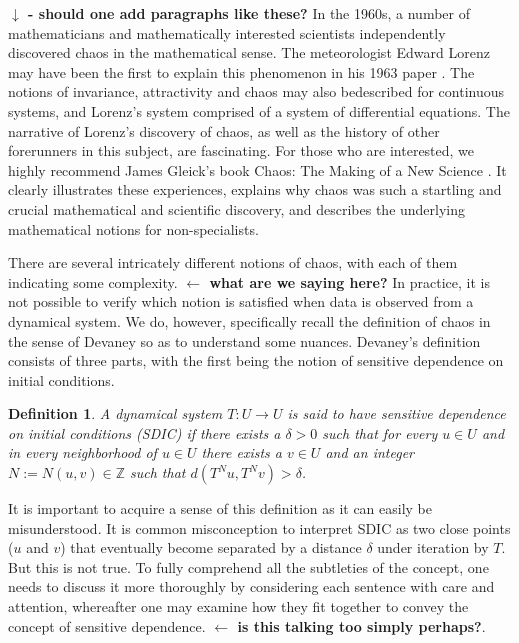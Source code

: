 \documentclass[12 pt]{article}
\newtheorem{Definition}{Definition}[]
\begin{document}
\textbf{$\downarrow$ - should one add paragraphs like these?}
\newline In the 1960s, a number of mathematicians and mathematically interested scientists independently discovered chaos in the mathematical sense. The meteorologist Edward Lorenz may have been the first to explain this phenomenon in his 1963 paper \cite{lorenz1963deterministic}. The notions of invariance, attractivity and chaos may also bedescribed for continuous systems, and Lorenz's system comprised of a system of differential equations. The narrative of Lorenz's discovery of chaos, as well as the history of other forerunners in this subject, are fascinating. For those who are interested, we highly recommend James Gleick's book Chaos: The Making of a New Science \cite{gleick2008chaos}. It clearly illustrates these experiences, explains why chaos was such a startling and crucial mathematical and scientific discovery, and describes the underlying mathematical notions for non-specialists.

There are several intricately different notions of chaos, with each of them indicating some complexity. \textbf{ $\leftarrow  $ what are we saying here?} In practice, it is not possible to verify which notion is satisfied when data is observed from a dynamical system. We do, however, specifically recall the definition of chaos in the sense of Devaney \cite{devaney2018introduction,de2013elements} so as to understand some nuances. Devaney's definition consists of three parts, with the first being the notion  of sensitive dependence on initial conditions. 

\begin{Definition} \rm 
A dynamical system $T: U \to U$ is said to have sensitive dependence on initial conditions (SDIC) if there exists a $\delta > 0$ such that for every $u \in U$ and in every neighborhood of $u \in U$ there exists a $v\in{U}$ and an integer $N:=N{(u,v)}\in\mathbb{Z}$ such that $d(T^Nu,T^Nv)>\delta$. 	
\end{Definition}

It is important to acquire a sense of this definition as it can easily be misunderstood. It is common misconception to interpret SDIC as two close points ($u$ and $v$) that eventually become separated by a distance $\delta$ under iteration by $T$. But this is not true. To fully comprehend all the subtleties of the concept, one needs to discuss it more thoroughly by considering each sentence with care and attention, whereafter one may examine how they fit together to convey the concept of sensitive dependence. 
\textbf{ $\leftarrow$ is this talking too simply perhaps?}. 
\end{document}
